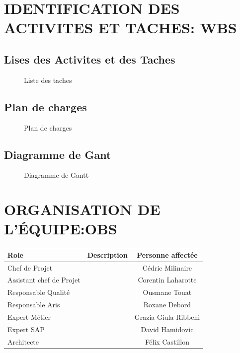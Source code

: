 \documentclass[]{scrartcl}
\begin{document}
\section{IDENTIFICATION DES ACTIVITES ET TACHES: WBS}
\subsection{Lises des Activites et des Taches}
\begin{center}
\begin{figure}[H]
\caption{Liste des taches}
\end{figure}
\end{center}
\subsection{Plan de charges}
\begin{center}
\begin{figure}[H]
\caption{Plan de charges}
\end{figure}
\end{center}
\subsection{Diagramme de Gant}
\begin{figure}[H]
\caption{Diagramme de Gantt}
\end{figure}
\section{ORGANISATION DE L'ÉQUIPE:OBS}
\begin{center}
	\begin{tabular}{| l | c | c |}
	\hline
	Role                     & Description & Personne affectée  \\ 	\hline
	Chef de Projet           &             & Cédric Milinaire                   	\\ \hline
	Assistant chef de Projet &             & Corentin Laharotte                  	\\ \hline
	Responsable Qualité      &             & Ousmane Touat                 	\\ \hline
	Responsable Aris         &             & Roxane Debord                 	\\ \hline
	Expert Métier            &             & Grazia Giula Ribbeni                 	\\ \hline
	Expert SAP               &             & David Hamidovic                 	\\ \hline
	Architecte               &             & Félix Castillon  \\ 		\hline
	\end{tabular}
\end{center}
\end{document}
